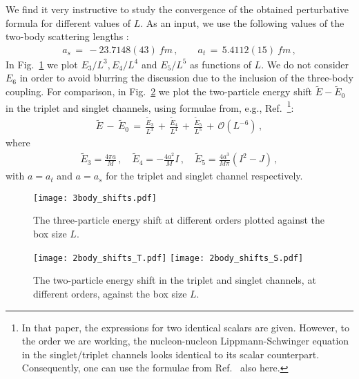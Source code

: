 \documentclass[12pt,prd,tightenlines,nofootinbib]{revtex4-2}
\begin{document}
We find it very instructive to study the convergence of the obtained perturbative formula
for different values of $L$. As an input, we use the following values of the two-body
scattering lengths \cite{Hackenburg:2006qd}:
\begin{align}
    a_{s}\,=\, -23.7148(43) \SI{}{fm}\,,\quad\quad  
    a_{t}\,=\, 5.4112(15) \SI{}{fm}\,, 
\end{align}
In Fig.~\ref{fig:1} we plot $E_{3}/L^{3}, E_{4}/L^{4}$ and $E_{5}/L^{5}$ as
functions of $L$. We do not consider $E_{6}$ in order to avoid
blurring the discussion due to the inclusion of the three-body coupling.
For comparison, in Fig.~\ref{fig:2} we plot the two-particle energy shift $\tilde{E}-\tilde{E}_0$ in the triplet and singlet channels, using formulae from, e.g., Ref.~\cite{Beane:2007qr}\footnote{In that paper, the expressions for two identical scalars are given.
However, to the order we are working, the nucleon-nucleon
Lippmann-Schwinger equation in the
singlet/triplet channels looks identical to its scalar counterpart. Consequently, one can use the formulae from Ref.~\cite{Beane:2007qr} also here.}:
\begin{align}
 \tilde{E}\, -\, \tilde{E}_{0}\, =\, \frac{\tilde{E}_{3}}{L^{3}}\, +\, \frac{\tilde{E}_{4}}{L^{4}}\, +\, \frac{\tilde{E}_{5}}{L^{5}}\,+\, \mathcal{O}(L^{-6})\,,
\end{align}
where
\begin{align}
	\tilde{E}_{3} = \frac{4\pi a}{M}\,, \quad \tilde{E}_{4} = -\frac{4 a^2}{M} I \,, \quad \tilde{E}_{5} = \frac{4 a^3}{M \pi} (I^2-J) \,,
\end{align}
with $a = a_t$ and $a = a_s$ for the triplet and singlet channel respectively.

\begin{figure}
    \centering
   \texttt{[image: 3body\_shifts.pdf]}
    \caption{The three-particle energy shift at different orders plotted against the box size $L$.}
    \label{fig:1}
  \end{figure}


\begin{figure}
    \centering
    \texttt{[image: 2body\_shifts\_T.pdf]}\vspace*{.4cm}
    \texttt{[image: 2body\_shifts\_S.pdf]}
    \caption{The two-particle energy shift in the triplet and singlet channels,
      at different orders, against the box size $L$.}
    \label{fig:2}
  \end{figure}
\end{document}
